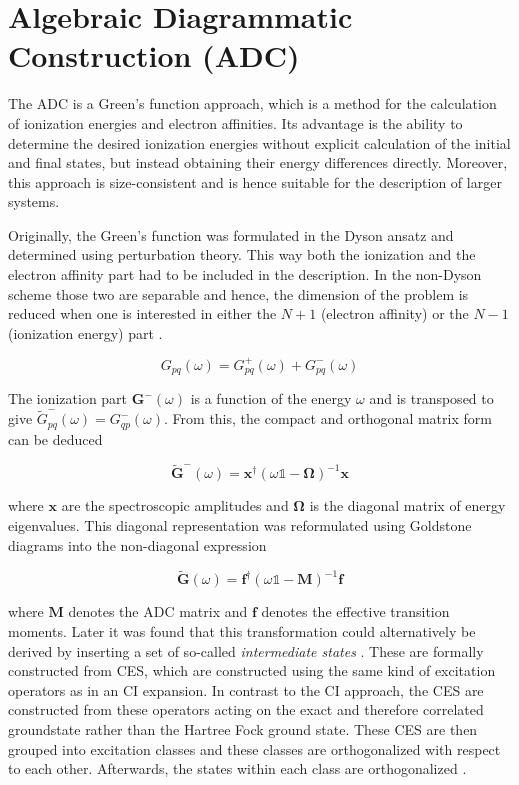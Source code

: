 \chapter{Algebraic Diagrammatic Construction (ADC)}

The \acl{ADC} is a Green's function approach, which is a method for the
calculation of ionization
energies and electron affinities.
Its advantage is the ability to determine the desired ionization energies
without explicit calculation of the initial and final states, but instead
obtaining their energy differences directly.
Moreover, this approach is size-consistent and is hence
suitable for the description of larger systems. \cite{Mertins96_1}

Originally, the Green's function was formulated in the Dyson ansatz and
determined using perturbation theory. This way both the ionization and the
electron affinity part had to be included in the description. In the non-Dyson
scheme those two are separable and hence, the dimension of the problem is reduced
when one is interested in either the $N+1$ (electron affinity)
or the $N-1$ (ionization energy) part \cite{Schirmer98}.

\begin{equation}
 G_{pq}(\omega) = G^+_{pq}(\omega) + G^-_{pq}(\omega)
\end{equation}

The ionization part $\mathbf{G^-}(\omega)$ is a function of the energy
$\omega$ and is transposed to give
$\tilde{G}^-_{pq}(\omega) = G^-_{qp}(\omega)$. From this, the compact 
and orthogonal matrix
form can be deduced

\begin{equation}\label{matrixspec}
\mathbf{\tilde{G}}^-(\omega) = \mathbf{x}^\dagger
                               (\omega\mathds{1}-\mathbf{\Omega})^{-1}\mathbf{x}
\end{equation}

where $\mathbf{x}$ are the spectroscopic amplitudes and $\mathbf{\Omega}$ is
the diagonal matrix of energy eigenvalues.
This diagonal representation was reformulated using Goldstone diagrams
into the non-diagonal expression

\begin{equation}\label{isradc}
\mathbf{\tilde{G}}(\omega) = \mathbf{f}^\dagger(\omega\mathds{1}-\mathbf{M})^{-1}\mathbf{f}
\end{equation}

where $\mathbf{M}$ denotes the \ac{ADC} matrix and $\mathbf{f}$ denotes
the effective transition moments.
Later it was found that this transformation could alternatively be
derived by inserting a set of so-called \emph{intermediate states}
\cite{Schirmer91}.
These are formally constructed from \ac{CES}, which are constructed
using the same kind of excitation operators as in an \ac{CI} expansion.
In contrast to the \ac{CI} approach, the \ac{CES}
are constructed from these operators
acting on the exact and therefore correlated groundstate rather than the
Hartree Fock ground state. These \ac{CES} are then
grouped into excitation classes
and these classes are orthogonalized with respect to each other. Afterwards,  
the states within each class are orthogonalized \cite{Mertins96_1}.

